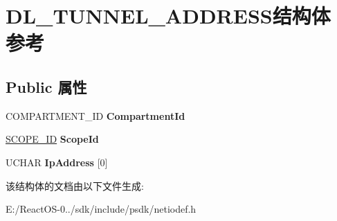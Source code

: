 \hypertarget{struct_d_l___t_u_n_n_e_l___a_d_d_r_e_s_s}{}\section{D\+L\+\_\+\+T\+U\+N\+N\+E\+L\+\_\+\+A\+D\+D\+R\+E\+S\+S结构体 参考}
\label{struct_d_l___t_u_n_n_e_l___a_d_d_r_e_s_s}
\subsection*{Public 属性}
\begin{DoxyCompactItemize}
\item 
\mbox{\label{struct_d_l___t_u_n_n_e_l___a_d_d_r_e_s_s_a12e1576c526694a4c43db3e2ab23be1d}} 
C\+O\+M\+P\+A\+R\+T\+M\+E\+N\+T\+\_\+\+ID {\bfseries Compartment\+Id}
\item 
\mbox{\label{struct_d_l___t_u_n_n_e_l___a_d_d_r_e_s_s_acbe4002598f5ca4cfae5b05944358782}} 
\hyperlink{struct_s_c_o_p_e___i_d}{S\+C\+O\+P\+E\+\_\+\+ID} {\bfseries Scope\+Id}
\item 
\mbox{\label{struct_d_l___t_u_n_n_e_l___a_d_d_r_e_s_s_a067eeb6502a0f344d80d2617f08ddd7e}} 
U\+C\+H\+AR {\bfseries Ip\+Address} \mbox{[}0\mbox{]}
\end{DoxyCompactItemize}


该结构体的文档由以下文件生成\+:\begin{DoxyCompactItemize}
\item 
E\+:/\+React\+O\+S-\/0../sdk/include/psdk/netiodef.\+h\end{DoxyCompactItemize}
